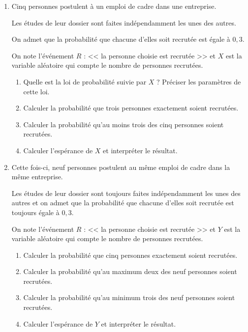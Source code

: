 \documentclass[10pt,french]{book}
\begin{document}
\begin{enumerate}
    \item Cinq personnes postulent à un emploi de cadre dans une entreprise.\par Les études de leur dossier sont faites indépendamment les unes des autres.\par On admet que la probabilité que chacune d'elles soit recrutée est égale à $0,3$.\par
        On note l'événement $R$ : << la personne choisie est recrutée >> et $X$ est la variable aléatoire qui compte le nombre de personnes recrutées.

        \begin{enumerate}
            \item Quelle est la loi de probabilité suivie par $X$ ? Préciser les paramètres de cette loi.
            \item Calculer la probabilité que trois personnes exactement soient recrutées.
            \item Calculer la probabilité qu'au moins trois des cinq personnes soient recrutées.
            \item Calculer l'espérance de $X$ et interpréter le résultat.
        \end{enumerate}

    \item Cette fois-ci, neuf personnes postulent au même emploi de cadre dans la même entreprise. \par Les études de leur dossier sont toujours faites indépendamment les unes des autres et on admet que la probabilité que chacune d'elles soit recrutée est toujours égale à $0,3$.\par
        On note l'événement $R$ : << la personne choisie est recrutée >> et $Y$ est la variable aléatoire qui compte le nombre de personnes recrutées.

        \begin{enumerate}
            \item Calculer la probabilité que cinq personnes exactement soient recrutées.
            \item Calculer la probabilité qu'au maximum deux des neuf personnes soient recrutées.
            \item Calculer la probabilité qu'au minimum trois des neuf personnes soient recrutées.
            \item Calculer l'espérance de $Y$ et interpréter le résultat.
        \end{enumerate}
\end{enumerate}
\end{document}
